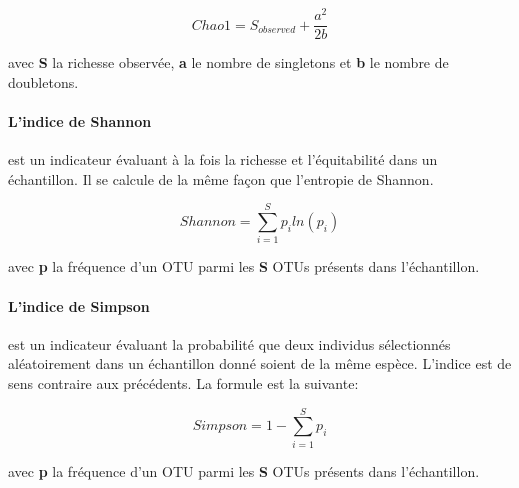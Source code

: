 \documentclass[12pt,a4paper]{article}
\begin{document}
\begin{mycapequ}[!h]
   \begin{equation}
     Chao1 = S_{observed} + \frac{a^2}{2b}
   \end{equation}
      \caption{avec \textbf{S} la richesse observée, \textbf{a} le nombre de singletons et \textbf{b} le nombre de doubletons.}
\end{mycapequ}
\paragraph{L'indice de Shannon} est un indicateur évaluant à la fois la richesse et l'équitabilité dans un échantillon. Il se calcule de la même façon que l’entropie de Shannon.

\begin{mycapequ}[!h]
   \begin{equation}
     Shannon = \sum_{i=1}^Sp_{i}ln(p_{i})
   \end{equation}
      \caption{avec \textbf{p} la fréquence d'un OTU parmi les \textbf{S} OTUs présents dans l'échantillon.}
\end{mycapequ}

\paragraph{L'indice de Simpson}est un indicateur évaluant la probabilité que deux individus sélectionnés aléatoirement dans un échantillon donné soient de la même espèce. L'indice est de sens contraire aux précédents. La formule est la suivante:

\begin{mycapequ}[!h]
   \begin{equation}
     Simpson = 1 - \sum_{i=1}^Sp_{i}
   \end{equation}
      \caption{avec \textbf{p} la fréquence d'un OTU parmi les \textbf{S} OTUs présents dans l'échantillon.}
\end{mycapequ}
\end{document}
